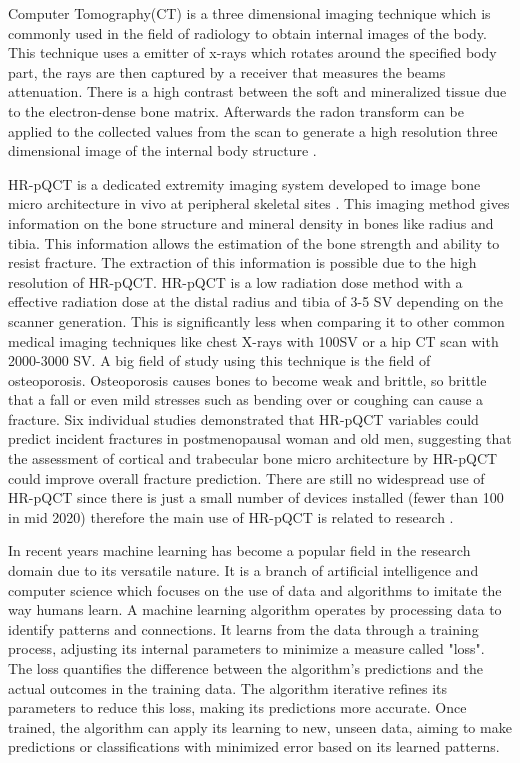 \documentclass[
a4paper, 
12pt,
grayscalebody, %
abstract=on,
twoside, BCOR10mm, 12pt, DIV13,headinclude, footexclude, final, abstracton, openright
]{ibireprt}
\numberwithin{equation}{chapter}
\numberwithin{table}{chapter}
\numberwithin{figure}{chapter}
\numberwithin{algorithm}{chapter}
\numberwithin{example}{chapter}
\numberwithin{example}{chapter}
\begin{document}
	Computer Tomography(CT) is a three dimensional imaging technique which is commonly used in the field of radiology  to obtain internal images of the body. This technique uses a emitter of x-rays which rotates around the specified body part, the rays are then captured by a receiver that measures the beams attenuation. There is a high contrast between the soft and mineralized tissue  due to the electron-dense bone matrix. Afterwards the radon transform can be applied to the collected values from the scan to generate a high resolution three dimensional image of the internal body structure \cite{Burghardt2011}.

HR-pQCT is a  dedicated extremity imaging system developed to image bone micro architecture in vivo at peripheral skeletal sites \cite{Bergh2021}. This imaging method gives information on the bone structure and mineral density in bones like radius and tibia. This information allows the estimation of the bone strength and ability to resist fracture. The extraction of this information is possible due to the high resolution of HR-pQCT.%
 HR-pQCT is a low radiation dose method with a effective radiation dose at the distal radius and tibia of  3-5 \textmu SV depending on the scanner  generation. This is significantly less when comparing it to other common medical imaging techniques like chest X-rays with 100\textmu SV or a hip CT scan with 2000-3000 \textmu SV. A big field of study using this technique is the field of osteoporosis. Osteoporosis causes bones to become weak and brittle, so brittle that a fall or even mild stresses such as bending over or coughing can cause a fracture. Six individual studies demonstrated that HR-pQCT variables could predict incident fractures in postmenopausal woman and old men, suggesting that the assessment of cortical and trabecular bone micro architecture by HR-pQCT could improve overall fracture prediction. There are still no widespread use of HR-pQCT since there is just a small number of devices installed (fewer than 100 in mid 2020) therefore the main use of HR-pQCT is related to research \cite{Bergh2021}.


In recent years machine learning has become a popular field in the research domain due to its versatile nature. It is a branch of artificial intelligence and computer science which focuses on the use of data and algorithms to imitate the way humans learn. A machine learning algorithm operates by processing data to identify patterns and connections. It learns from the data through a training process, adjusting its internal parameters to minimize a measure called "loss". The loss quantifies the difference between the algorithm's predictions and the actual outcomes in the training data. The algorithm iterative refines its parameters to reduce this loss, making its predictions more accurate. Once trained, the algorithm can apply its learning to new, unseen data, aiming to make predictions or classifications with minimized error based on its learned patterns.
\end{document}
